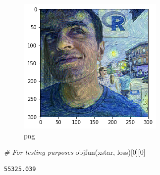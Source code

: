 \documentclass[]{book}
\newenvironment{Shaded}{\begin{snugshade}}{\end{snugshade}}
\newcommand{\DecValTok}[1]{\textcolor[rgb]{0.00,0.00,0.81}{#1}}
\newcommand{\CommentTok}[1]{\textcolor[rgb]{0.56,0.35,0.01}{\textit{#1}}}
\newcommand{\NormalTok}[1]{#1}
\theoremstyle{definition}
\theoremstyle{definition}
\theoremstyle{definition}
\theoremstyle{remark}
\begin{document}
\begin{figure}
\centering
\includegraphics{output_11_2.png}
\caption{png}
\end{figure}

\begin{Shaded}
\begin{Highlighting}[]
\CommentTok{# For testing purposes}
\NormalTok{objfun(xstar, loss)[}\DecValTok{0}\NormalTok{][}\DecValTok{0}\NormalTok{]}
\end{Highlighting}
\end{Shaded}

\begin{verbatim}
55325.039
\end{verbatim}


\end{document}
